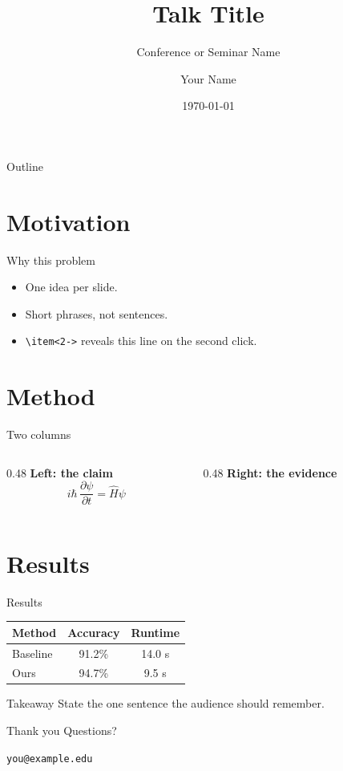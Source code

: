 \documentclass[aspectratio=169]{beamer}
\title{Talk Title}
\subtitle{Conference or Seminar Name}
\author{Your Name}
\institute{Department, University}
\date{\today}
\begin{document}
\begin{frame}
  \titlepage
\end{frame}

\begin{frame}{Outline}
  \tableofcontents
\end{frame}

\section{Motivation}

\begin{frame}[fragile]{Why this problem}
  \begin{itemize}
    \item One idea per slide.
    \item Short phrases, not sentences.
    \item<2-> \verb|\item<2->| reveals this line on the second click.
  \end{itemize}
\end{frame}

\section{Method}

\begin{frame}{Two columns}
  \begin{columns}[T]
    \begin{column}{0.48\textwidth}
      \textbf{Left: the claim}
      \begin{equation*}
        i\hbar\,\frac{\partial \psi}{\partial t} = \hat{H}\psi
      \end{equation*}
    \end{column}
    \begin{column}{0.48\textwidth}
      \textbf{Right: the evidence}

      \medskip
    \end{column}
  \end{columns}
\end{frame}

\section{Results}

\begin{frame}{Results}
  \centering
  \begin{tabular}{lcc}
    \toprule
    Method & Accuracy & Runtime \\
    \midrule
    Baseline & 91.2\% & 14.0 s \\
    Ours     & 94.7\% & 9.5 s \\
    \bottomrule
  \end{tabular}

  \bigskip
  \begin{block}{Takeaway}
    State the one sentence the audience should remember.
  \end{block}
\end{frame}

\begin{frame}{Thank you}
  \centering
  Questions?

  \medskip
  \texttt{you@example.edu}
\end{frame}
\end{document}
